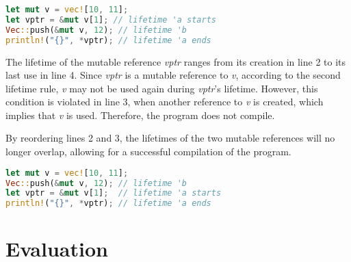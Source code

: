 \documentclass[sigplan,11pt,nonacm]{acmart}
\begin{document}
\begin{lstlisting}[language=Rust,captionpos=b,caption={Rust use-after-free with lifetimes}]
let mut v = vec![10, 11];
let vptr = &mut v[1]; // lifetime 'a starts
Vec::push(&mut v, 12); // lifetime 'b
println!("{}", *vptr); // lifetime 'a ends
\end{lstlisting}

The lifetime of the mutable reference \emph{vptr} ranges from its creation in line 2 to its last use in line 4.
Since \emph{vptr} is a mutable reference to \emph{v}, according to the second lifetime rule, \emph{v} may not be used again during \emph{vptr}'s lifetime.
However, this condition is violated in line 3, when another reference to \emph{v} is created, which implies that \emph{v} is used.
Therefore, the program does not compile.

By reordering lines 2 and 3, the lifetimes of the two mutable references will no longer overlap, allowing for a successful compilation of the program.
\begin{lstlisting}[language=Rust,captionpos=b,caption={Rust use-after-free corrected}]
let mut v = vec![10, 11];
Vec::push(&mut v, 12); // lifetime 'b
let vptr = &mut v[1];  // lifetime 'a starts
println!("{}", *vptr); // lifetime 'a ends
\end{lstlisting}






\section{Evaluation}
\end{document}

